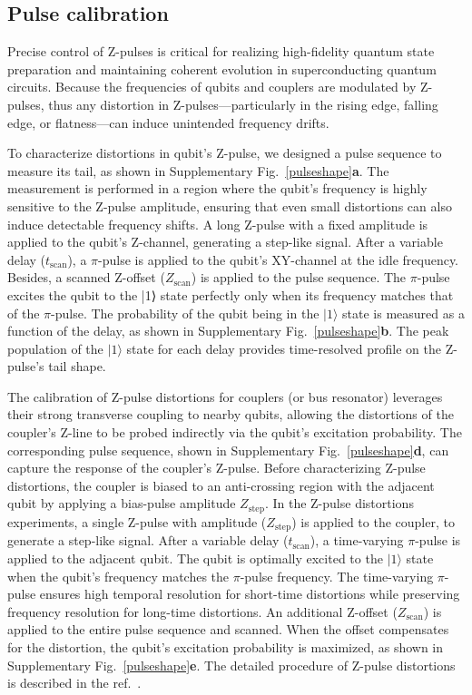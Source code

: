 \documentclass[reprint,superscriptaddress,preprintnumbers,longbibliography,
amsmath,amssymb,aps,floatfix,pra,twocolumn, tightenlines %
]{revtex4-2}
\begin{document}
	\subsection{Pulse calibration}
	Precise control of Z-pulses is critical for realizing high-fidelity quantum state preparation and maintaining coherent evolution in superconducting quantum circuits. Because the frequencies of qubits and couplers are modulated by Z-pulses, thus any distortion in Z-pulses—particularly in the rising edge, falling edge, or flatness—can induce unintended frequency drifts. 
    
    To characterize distortions in qubit’s Z-pulse, we designed a pulse sequence to measure its tail, as shown in Supplementary Fig.~\ref{pulseshape}\textbf{a}. The measurement is performed in a region where the qubit’s frequency is highly sensitive to the Z-pulse amplitude, ensuring that even small distortions can also induce detectable frequency shifts. A long Z-pulse with a fixed amplitude is applied to the qubit’s Z-channel, generating a step-like signal. After a variable delay ($t_{\text{scan}}$), a $\pi$-pulse is applied to the qubit’s XY-channel at the idle frequency. Besides, a scanned Z-offset ($Z_{\text{scan}}$) is applied to the pulse sequence. The $\pi$-pulse excites the qubit to the |1⟩ state perfectly only when its frequency matches that of the $\pi$-pulse. The probability of the qubit being in the $|1\rangle$ state is measured as a function of the delay, as shown in Supplementary Fig.~\ref{pulseshape}\textbf{b}. The peak population of the $|1\rangle$ state for each delay provides time-resolved profile on the Z-pulse’s tail shape. 
    
    The calibration of Z-pulse distortions for couplers (or bus resonator) leverages their strong transverse coupling to nearby qubits, allowing the distortions of the coupler’s Z-line to be probed indirectly via the qubit’s excitation probability. The corresponding pulse sequence, shown in Supplementary Fig.~\ref{pulseshape}\textbf{d}, can capture the response of the coupler’s Z-pulse. Before characterizing Z-pulse distortions, the coupler is biased to an anti-crossing region with the adjacent qubit by applying a bias-pulse amplitude $Z_{\text{step}}$.
    In the Z-pulse distortions experiments, a single Z-pulse with amplitude ($Z_{\text{step}}$) is applied to the coupler, to generate a step-like signal. After a variable delay ($t_{\text{scan}}$), a time-varying $\pi$-pulse is applied to the adjacent qubit. The qubit is optimally excited to the $|1\rangle$ state when the qubit’s frequency matches the $\pi$-pulse frequency. The time-varying $\pi$-pulse ensures high temporal resolution for short-time distortions while preserving frequency resolution for long-time distortions. An additional Z-offset ($Z_{\text{scan}}$) is applied to the entire pulse sequence and scanned. When the offset compensates for the distortion, the qubit’s excitation probability is maximized, as shown in Supplementary Fig.~\ref{pulseshape}\textbf{e}. The detailed procedure of Z-pulse distortions is described in the ref.~\cite{PRA_ltm}.
    
\end{document}
